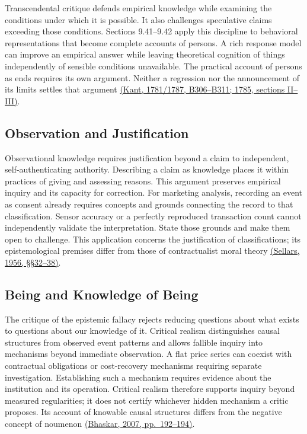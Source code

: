\noindent \noindent Transcendental critique defends empirical knowledge while
examining the conditions under which it is possible. It also challenges
speculative claims exceeding those conditions. Sections 9.41--9.42 apply
this discipline to behavioral representations that become complete
accounts of persons. A rich response model can improve an empirical
answer while leaving theoretical cognition of things independently of
sensible conditions unavailable. The practical account of persons as
ends requires its own argument. Neither a regression nor the
announcement of its limits settles that argument
\href{../01_Resources/15_Marketing_Dialectics/01_Kant_Primary_Texts/README.md}{(Kant,
1781/1787, B306--B311; 1785, sections II--III)}.

\hypertarget{M09-observation-and-justification}{%
\subsection{Observation and
Justification}\label{M09-observation-and-justification}}

\noindent \noindent Observational knowledge requires justification beyond a claim
to independent, self-authenticating authority. Describing a claim as
knowledge places it within practices of giving and assessing reasons.
This argument preserves empirical inquiry and its capacity for
correction. For marketing analysis, recording an event as consent
already requires concepts and grounds connecting the record to that
classification. Sensor accuracy or a perfectly reproduced transaction
count cannot independently validate the interpretation. State those
grounds and make them open to challenge. This application concerns the
justification of classifications; its epistemological premises differ
from those of contractualist moral theory
\href{https://www.ditext.com/sellars/epm8.html}{(Sellars, 1956,
§§32--38)}.

\hypertarget{M09-being-and-knowledge-of-being}{%
\subsection{Being and Knowledge of
Being}\label{M09-being-and-knowledge-of-being}}

\noindent \noindent The critique of the epistemic fallacy rejects reducing
questions about what exists to questions about our knowledge of it.
Critical realism distinguishes causal structures from observed event
patterns and allows fallible inquiry into mechanisms beyond immediate
observation. A flat price series can coexist with contractual
obligations or cost-recovery mechanisms requiring separate
investigation. Establishing such a mechanism requires evidence about the
institution and its operation. Critical realism therefore supports
inquiry beyond measured regularities; it does not certify whichever
hidden mechanism a critic proposes. Its account of knowable causal
structures differs from the negative concept of noumenon
\href{https://internationalcentreforcriticalrealism.wordpress.com/wp-content/uploads/2013/04/07-1-bhaskar-theorising-ontology-2007.pdf}{(Bhaskar,
2007, pp.~192--194)}.

